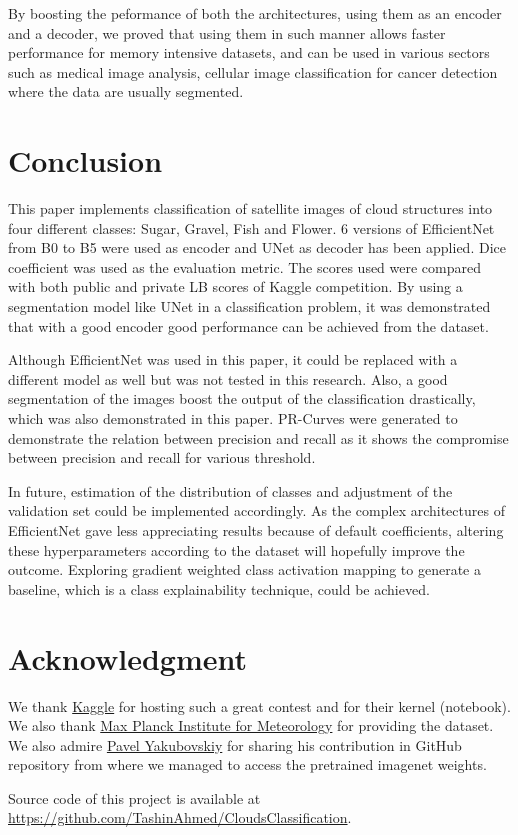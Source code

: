 \documentclass[conference]{IEEEtran}
\begin{document}
By boosting the peformance of both the architectures, using them as an encoder and a decoder, we proved that using them in such manner allows faster performance for memory intensive datasets, and can be used in various sectors such as medical image analysis, cellular image classification for cancer detection where the data are usually segmented.


\section {Conclusion} 
This paper implements classification of satellite images of cloud structures into four different classes: Sugar, Gravel, Fish and Flower. 6 versions of EfficientNet from B0 to B5 were used as encoder and UNet as decoder has been applied. Dice coefficient was used as the evaluation metric. The scores used were compared with both public and private LB scores of Kaggle competition. By using a segmentation model like UNet in a classification problem, it was demonstrated that with a good encoder good performance can be achieved from the dataset. 

Although EfficientNet was used in this paper, it could be replaced with a different model as well but was not tested in this research. Also, a good segmentation of the images boost the output of the classification drastically, which was also demonstrated in this paper. PR-Curves were generated to demonstrate the relation between precision and recall as it shows the compromise between precision and recall for various threshold. 

In future, estimation of the distribution of classes and adjustment of the validation set could be implemented accordingly. As the complex architectures of EfficientNet gave less appreciating results because of default coefficients, altering these hyperparameters according to the dataset will hopefully improve the outcome. Exploring gradient weighted class activation mapping to generate a baseline, which is a class explainability technique, could be achieved.

\section*{Acknowledgment}
We thank \href{https://www.kaggle.com/}{Kaggle} for hosting such a great contest and for their kernel (notebook). We also thank \href{https://www.mpimet.mpg.de/en/mpimet-homepage/}{Max Planck Institute for Meteorology} for providing the dataset. We also admire \href{https://github.com/qubvel}{Pavel Yakubovskiy} for sharing his contribution in GitHub repository from where we managed to access the pretrained imagenet weights.

Source code of this project is available at \color{blue} \url{https://github.com/TashinAhmed/CloudsClassification}\color{black}.


 

\end{document}
